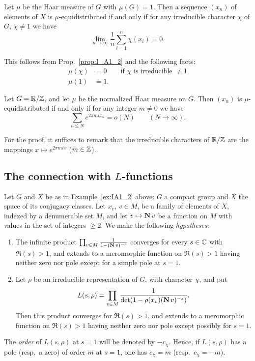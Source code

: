 \begin{subappendices}
\begin{corp}
Let $\mu$ be the Haar measure of $G$ with $\mu(G) = 1$.
Then a sequence $(x_n)$ of elements of $X$ is $\mu$-equidistributed if and
only if for any irreducible character $\chi$ of $G$, $\chi \ne 1$ we have
$$ \lim_{n\to\infty} \frac{1}{n} \sum_{i=1}^{n} \chi(x_i) = 0. $$
\end{corp}
This follows from Prop.~\ref{prop:I_A1_2} and the following facts:
\begin{align*}
	\mu(\chi) &= 0 \qquad \text{if $\chi$ is irreducible $\ne 1$} \\
	\mu(1) &= 1.
\end{align*}

\begin{corp}
Let $G = \mathbb{R}/\mathbb{Z}$, and let $\mu$ be the normalized Haar measure on $G$. Then
$(x_n)$ is $\mu$-equidistributed if and only if for any integer $m \ne 0$ we
have
$$ \sum_{n\le N} e^{2\pi mi x_n} = o(N) \qquad (N \to \infty). $$
\end{corp}
For the proof, it suffices to remark that the irreducible characters of $\mathbb{R}/\mathbb{Z}$
are the mappings $x \mapsto e^{2\pi mi x}$ ($m \in \mathbb{Z}$).

\subsection{The connection with \texorpdfstring{$L$}{L}-functions}
\label{sec:I_A2}
Let $G$ and $X$ be as in Example~\ref{ex:IA1_2} above: $G$ a compact group and
$X$ the space of its conjugacy classes. Let $x_v$, $v \in M$, be a family of
elements of $X$, indexed by a denumerable set $M$, and let $v \mapsto \operatorname{\mathbf{N}}
v$ be a function on $M$ with values in the set of integers $\ge 2$.
\dpage
We make the following \emph{hypotheses:}
\begin{enumerate}[(1), series=Lfunc_hyp]
\item
	The infinite product $\prod_{v\in M} \frac{1}{1 - (\operatorname{\mathbf{N}} v)^{-s}}$
	converges for every $s \in \mathbb{C}$ with $\Re(s) > 1$, and extends to a
	meromorphic function on $\Re(s) > 1$ having neither zero nor pole
	except for a simple pole at $s = 1$.
\item Let $\rho$ be an irreducible representation of $G$, with character
	$\chi$, and put
	\[
		L(s, \rho) = \prod_{v\in M} \frac{1}{\det(1 -
		\rho(x_v)(\operatorname{\mathbf{N}} v)^{-s})}.
	\]
	Then this product converges for $\Re(s) > 1$, and extends to a
	meromorphic function on $\Re(s) > 1$ having neither zero nor pole
	except possibly for $s = 1$.
\end{enumerate}
The \emph{order} of $L(s, \rho)$ at $s = 1$ will be denoted by $-c_\chi$. Hence,
if $L(s,\rho)$ has a pole (resp.\ a zero) of order $m$ at $s = 1$, one has
$c_\chi = m$ (resp.\ $c_\chi = -m$).


\end{subappendices}
